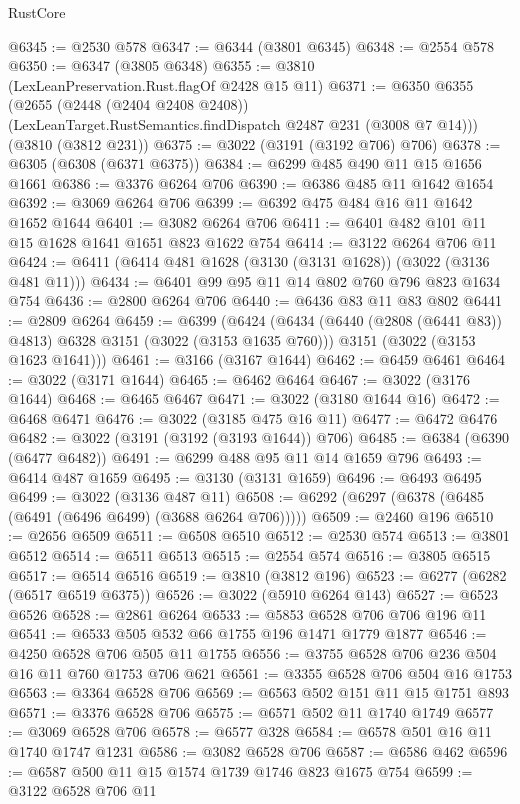 \begin{lexlean}{RustCore}
\begin{coremodule}
@6345 := @2530 @578
@6347 := @6344 (@3801 @6345)
@6348 := @2554 @578
@6350 := @6347 (@3805 @6348)
@6355 := @3810 (LexLeanPreservation.Rust.flagOf @2428 @15 @11)
@6371 := @6350
    @6355
    (@2655
      (@2448 (@2404 @2408 @2408))
      (LexLeanTarget.RustSemantics.findDispatch @2487 @231 (@3008 @7 @14)))
    (@3810 (@3812 @231))
@6375 := @3022 (@3191 (@3192 @706) @706)
@6378 := @6305 (@6308 (@6371 @6375))
@6384 := @6299 @485 @490 @11 @15 @1656 @1661
@6386 := @3376 @6264 @706
@6390 := @6386 @485 @11 @1642 @1654
@6392 := @3069 @6264 @706
@6399 := @6392 @475 @484 @16 @11 @1642 @1652 @1644
@6401 := @3082 @6264 @706
@6411 := @6401 @482 @101 @11 @15 @1628 @1641 @1651 @823 @1622 @754
@6414 := @3122 @6264 @706 @11
@6424 := @6411 (@6414 @481 @1628 (@3130 (@3131 @1628)) (@3022 (@3136 @481 @11)))
@6434 := @6401 @99 @95 @11 @14 @802 @760 @796 @823 @1634 @754
@6436 := @2800 @6264 @706
@6440 := @6436 @83 @11 @83 @802
@6441 := @2809 @6264
@6459 := @6399
    (@6424
      (@6434 (@6440 (@2808 (@6441 @83)) @4813) @6328 @3151 (@3022 (@3153 @1635 @760)))
      @3151
      (@3022 (@3153 @1623 @1641)))
@6461 := @3166 (@3167 @1644)
@6462 := @6459 @6461
@6464 := @3022 (@3171 @1644)
@6465 := @6462 @6464
@6467 := @3022 (@3176 @1644)
@6468 := @6465 @6467
@6471 := @3022 (@3180 @1644 @16)
@6472 := @6468 @6471
@6476 := @3022 (@3185 @475 @16 @11)
@6477 := @6472 @6476
@6482 := @3022 (@3191 (@3192 (@3193 @1644)) @706)
@6485 := @6384 (@6390 (@6477 @6482))
@6491 := @6299 @488 @95 @11 @14 @1659 @796
@6493 := @6414 @487 @1659
@6495 := @3130 (@3131 @1659)
@6496 := @6493 @6495
@6499 := @3022 (@3136 @487 @11)
@6508 := @6292 (@6297 (@6378 (@6485 (@6491 (@6496 @6499) (@3688 @6264 @706)))))
@6509 := @2460 @196
@6510 := @2656 @6509
@6511 := @6508 @6510
@6512 := @2530 @574
@6513 := @3801 @6512
@6514 := @6511 @6513
@6515 := @2554 @574
@6516 := @3805 @6515
@6517 := @6514 @6516
@6519 := @3810 (@3812 @196)
@6523 := @6277 (@6282 (@6517 @6519 @6375))
@6526 := @3022 (@5910 @6264 @143)
@6527 := @6523 @6526
@6528 := @2861 @6264
@6533 := @5853 @6528 @706 @706 @196 @11
@6541 := @6533 @505 @532 @66 @1755 @196 @1471 @1779 @1877
@6546 := @4250 @6528 @706 @505 @11 @1755
@6556 := @3755 @6528 @706 @236 @504 @16 @11 @760 @1753 @706 @621
@6561 := @3355 @6528 @706 @504 @16 @1753
@6563 := @3364 @6528 @706
@6569 := @6563 @502 @151 @11 @15 @1751 @893
@6571 := @3376 @6528 @706
@6575 := @6571 @502 @11 @1740 @1749
@6577 := @3069 @6528 @706
@6578 := @6577 @328
@6584 := @6578 @501 @16 @11 @1740 @1747 @1231
@6586 := @3082 @6528 @706
@6587 := @6586 @462
@6596 := @6587 @500 @11 @15 @1574 @1739 @1746 @823 @1675 @754
@6599 := @3122 @6528 @706 @11

\end{coremodule}
\end{lexlean}
